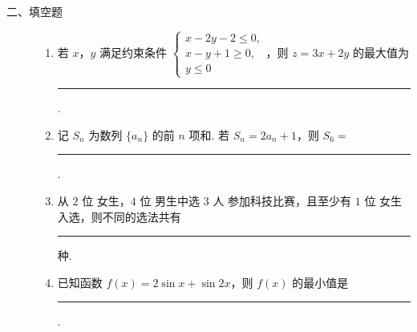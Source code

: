 \begin{description}

    \item[二、填空题]

    \begin{enumerate}[leftmargin=5pt]

      \addtocounter{enumi}{+12}

        \item 若 \(x\)，\(y\) 满足约束条件 \(\begin{cases}
x-2y-2\le0,\\
x-y+1\ge0,\\
y\le0
\end{cases}\)，则 \(z=3x+2y\) 的最大值为\rule[-0.3ex]{3em}{0.4pt}.

        \item 记 \(S_n\) 为数列 \(\{a_n\}\) 的前 \(n\) 项和. 若 \(S_n=2a_n+1\)，则 \(S_6=\)\rule[-0.3ex]{3em}{0.4pt}.

        \item 从 \(2\text{ 位}\) 女生，\(4\text{ 位}\) 男生中选 \(3\text{ 人}\) 参加科技比赛，且至少有 \(1\text{ 位}\) 女生入选，则不同的选法共有\rule[-0.3ex]{3em}{0.4pt}\(\text{种}\).

        \item 已知函数 \(f(x)=2\sin x+\sin2x\)，则 \(f(x)\) 的最小值是\rule[-0.3ex]{3em}{0.4pt}.

    \end{enumerate}

\end{description}

